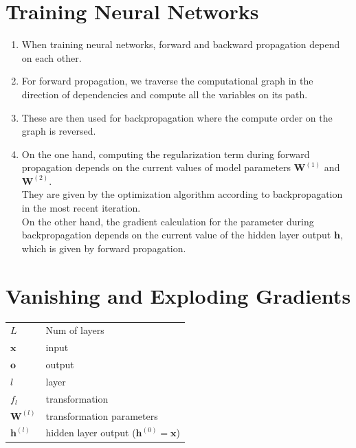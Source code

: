 \section{Training Neural Networks \cite{dnn-1}}

\begin{enumerate}
    \item When training neural networks, forward and backward propagation depend on each other. 
    
    \item For forward propagation, we traverse the computational graph in the direction of dependencies and compute all the variables on its path. 
    
    \item These are then used for backpropagation where the compute order on the graph is reversed.

    \item On the one hand, computing the regularization term during forward propagation depends on the current values of model parameters $\mathbf{W}^{(1)}$ and $\mathbf{W}^{(2)}$.\\
    They are given by the optimization algorithm according to backpropagation in the most recent iteration.\\
    On the other hand, the gradient calculation for the parameter during backpropagation depends on the current value of the hidden layer output $\mathbf{h}$, which is given by forward propagation.


\end{enumerate}


\section{Vanishing and Exploding Gradients \cite{dnn-1}} \label{Vanishing and Exploding Gradients}

\begin{customTableWrapper}{1.5}
\begin{table}[H]
    \centering
    \begin{tabular}{|l|p{8cm}|}
        \hline
        
        $L$ & Num of layers \\

        $\mathbf{x}$ & input \\

        $\mathbf{o}$ & output \\

        $l$ & layer \\

        $f_l$ & transformation \\

        $\mathbf{W}^{(l)}$ & transformation parameters \\

        $\mathbf{h}^{(l)}$ & hidden layer output ($\mathbf{h}^{(0)} = \mathbf{x}$) \\

        
        
        \hline
    \end{tabular}
\end{table}
\end{customTableWrapper}

